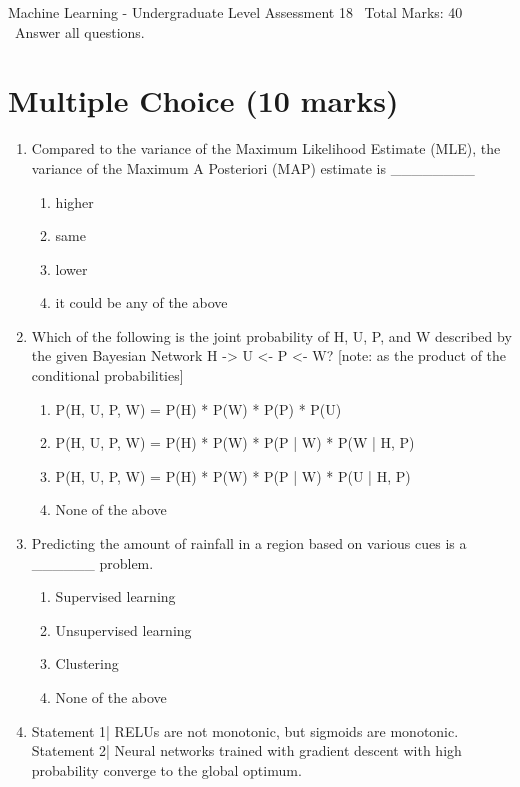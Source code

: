 \documentclass[12pt]{article}
\begin{document}
\begin{center}
Machine Learning - Undergraduate Level Assessment 18 \
Total Marks: 40 \
Answer all questions.
\end{center}

\section*{Multiple Choice (10 marks)}
\begin{enumerate}[label=\arabic*.]
\item Compared to the variance of the Maximum Likelihood Estimate (MLE), the variance of the Maximum A Posteriori (MAP) estimate is \_\_\_\_\_\_\_\_
\begin{enumerate}[label=(\alph*)]
    \item higher
    \item same
    \item lower
    \item it could be any of the above
\end{enumerate}
\item Which of the following is the joint probability of H, U, P, and W described by the given Bayesian Network H -\textgreater{} U \textless{}- P \textless{}- W? [note: as the product of the conditional probabilities]
\begin{enumerate}[label=(\alph*)]
    \item P(H, U, P, W) = P(H) * P(W) * P(P) * P(U)
    \item P(H, U, P, W) = P(H) * P(W) * P(P | W) * P(W | H, P)
    \item P(H, U, P, W) = P(H) * P(W) * P(P | W) * P(U | H, P)
    \item None of the above
\end{enumerate}
\item Predicting the amount of rainfall in a region based on various cues is a \_\_\_\_\_\_ problem.
\begin{enumerate}[label=(\alph*)]
    \item Supervised learning
    \item Unsupervised learning
    \item Clustering
    \item None of the above
\end{enumerate}
\item Statement 1| RELUs are not monotonic, but sigmoids are monotonic. Statement 2| Neural networks trained with gradient descent with high probability converge to the global optimum.

\end{enumerate}
\end{document}
